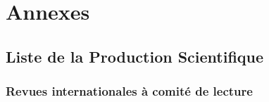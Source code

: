 \documentclass[
  11pt,
]{article}
\begin{document}
\hypertarget{annexes}{%
\section*{Annexes}\label{annexes}}

\renewcommand{\thesection}{\Alph{section}}

\hypertarget{articles}{%
\subsection{Liste de la Production Scientifique}\label{articles}}

\hypertarget{revues-internationales-uxe0-comituxe9-de-lecture}{%
\subsubsection{Revues internationales à comité de
lecture}\label{revues-internationales-uxe0-comituxe9-de-lecture}}
\end{document}
